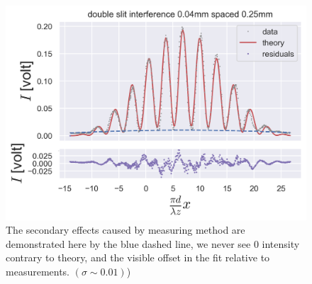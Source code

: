 \begin{figure}[H]
    \includegraphics[width=0.9\columnwidth]{figures/0.04w0.25s memory.png}
    \caption{The secondary effects caused by measuring method are demonstrated here by the blue dashed line, we never see 0 intensity contrary to theory, and the visible offset in the fit relative to measurements. $(\sigma\sim0.01)$)}
    \label{fig:0.04w0.25s_memory}
\end{figure}